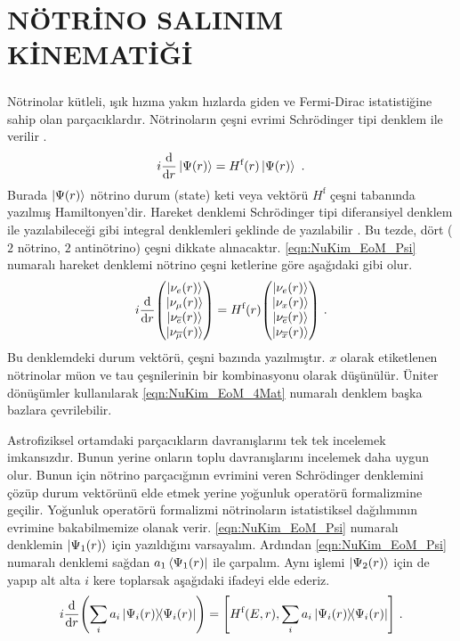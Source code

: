\newpage
\chapter{NÖTRİNO SALINIM KİNEMATİĞİ}\label{ch:nuHareketKinematik}
\paragraph{}
Nötrinolar kütleli, ışık hızına yakın hızlarda giden ve Fermi-Dirac istatistiğine sahip olan parçacıklardır. Nötrinoların çeşni evrimi Schrödinger tipi denklem ile verilir \cite{Raffelt:1996wa}. 
\begin{equation}\label{eqn:NuKim_EoM_Psi}
	i\dv{r} \ket{\Psi(r)}= H^{\text{f}}(r) \ket{\Psi(r)} \text{ .}
\end{equation}
Burada $ \ket{\Psi(r)} $ nötrino durum (state) keti veya vektörü $ H^{\text{f}} $ çeşni tabanında yazılmış Hamiltonyen'dir. Hareket denklemi Schrödinger tipi diferansiyel denklem ile yazılabileceği gibi integral denklemleri şeklinde de yazılabilir \cite{Kneller:2005hf}. Bu tezde, dört ($ 2 $ nötrino, $ 2 $ antinötrino) çeşni dikkate alınacaktır. \eqref{eqn:NuKim_EoM_Psi} numaralı hareket denklemi nötrino çeşni ketlerine göre aşağıdaki gibi olur.
\begin{equation}\label{eqn:NuKim_EoM_4Mat}
	i\dv{r} \mqty(\ket{\nu_{e}(r)} \\ \ket{\nu_{\mu}(r)}\\ \ket{\nu_{\overline{e}}(r)}\\ \ket{\nu_{\overline{\mu}}(r)}) = H^{\text{f}}(r) \mqty(\ket{\nu_{e}(r)} \\ \ket{\nu_{x}(r)}\\ \ket{\nu_{\overline{e}}(r)}\\ \ket{\nu_{\overline{x}}(r)}) \text{ .}
\end{equation}
Bu denklemdeki durum vektörü, çeşni bazında yazılmıştır. $ x $ olarak etiketlenen nötrinolar müon ve tau çeşnilerinin bir kombinasyonu olarak düşünülür. Üniter dönüşümler kullanılarak \eqref{eqn:NuKim_EoM_4Mat} numaralı denklem başka bazlara çevrilebilir.

Astrofiziksel ortamdaki parçacıkların davranışlarını tek tek incelemek imkansızdır. Bunun yerine onların toplu davranışlarını incelemek daha uygun olur. Bunun için nötrino parçacığının evrimini veren Schrödinger denklemini çözüp durum vektörünü elde etmek yerine yoğunluk operatörü formalizmine geçilir. Yoğunluk operatörü formalizmi nötrinoların istatistiksel dağılımının evrimine bakabilmemize olanak verir. \eqref{eqn:NuKim_EoM_Psi} numaralı denklemin $ \ket{\Psi_{1}(r)} $ için yazıldığını varsayalım. Ardından \eqref{eqn:NuKim_EoM_Psi} numaralı denklemi sağdan $ a_{1}\bra{\Psi_{1}(r)} $ ile çarpalım. Aynı işlemi $ \ket{\Psi_{2}(r)} $ için de yapıp alt alta $ i $ kere toplarsak aşağıdaki ifadeyi elde ederiz.
\begin{equation}
	i\dv{r} \qty(\sum_{i} a_{i} \dyad{\Psi_{i}(r)}{\Psi_{i}(r)})  = \comm{H^{\text{f}}(E,r)}{\sum_{i} a_{i} \dyad{\Psi_{i}(r)}{\Psi_{i}(r)} } \text{ .}
\end{equation}

